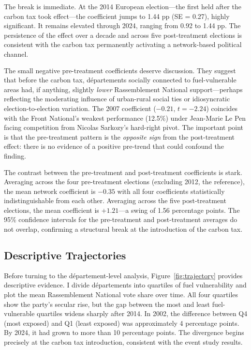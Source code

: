 \documentclass[12pt]{article}
\newcommand{\rn}{Rassemblement National}
\newcommand{\fn}{Front National}
\newcommand{\dept}{d\'{e}partement}
\newcommand{\depts}{d\'{e}partements}
\begin{document}
The break is immediate. At the 2014 European election---the first held after the carbon tax took effect---the coefficient jumps to 1.44 pp (SE = 0.27), highly significant. It remains elevated through 2024, ranging from 0.92 to 1.44 pp. The persistence of the effect over a decade and across five post-treatment elections is consistent with the carbon tax permanently activating a network-based political channel.

The small negative pre-treatment coefficients deserve discussion. They suggest that before the carbon tax, \depts{} socially connected to fuel-vulnerable areas had, if anything, slightly \emph{lower} \rn{} support---perhaps reflecting the moderating influence of urban-rural social ties or idiosyncratic election-to-election variation. The 2007 coefficient ($-0.21$, $t = -2.24$) coincides with the \fn{}'s weakest performance (12.5\%) under Jean-Marie Le Pen facing competition from Nicolas Sarkozy's hard-right pivot. The important point is that the pre-treatment pattern is the \emph{opposite sign} from the post-treatment effect: there is no evidence of a positive pre-trend that could confound the finding.

The contrast between the pre-treatment and post-treatment coefficients is stark. Averaging across the four pre-treatment elections (excluding 2012, the reference), the mean network coefficient is $-0.35$ with all four coefficients statistically indistinguishable from each other. Averaging across the five post-treatment elections, the mean coefficient is $+1.21$---a swing of 1.56 percentage points. The 95\% confidence intervals for the pre-treatment and post-treatment averages do not overlap, confirming a structural break at the introduction of the carbon tax.

\subsection{Descriptive Trajectories}

Before turning to the \dept{}-level analysis, Figure~\ref{fig:trajectory} provides descriptive evidence. I divide \depts{} into quartiles of fuel vulnerability and plot the mean \rn{} vote share over time. All four quartiles show the party's secular rise, but the gap between the most and least fuel-vulnerable quartiles widens sharply after 2014. In 2002, the difference between Q4 (most exposed) and Q1 (least exposed) was approximately 4 percentage points. By 2024, it had grown to more than 10 percentage points. The divergence begins precisely at the carbon tax introduction, consistent with the event study results.
\end{document}
